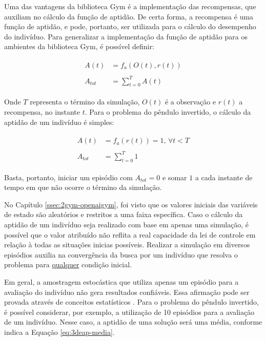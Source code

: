 Uma das vantagens da biblioteca Gym é a implementação das recompensas, que auxiliam no cálculo da função de aptidão. De certa forma, a recompensa é uma função de aptidão, e pode, portanto, ser utilizada para o cálculo do desempenho do indivíduo. Para generalizar a implementação da função de aptidão para os ambientes da biblioteca Gym, é possível definir:

\begin{align}\label{eq:3deap-calcaptidaotot}
\begin{split}
A(t) &= f_a(O(t), r(t))\\\\
A_{tot} &= \sum_{t=0}^{T}A(t)
\end{split}
\end{align}

Onde $T$ representa o término da simulação, $O(t)$ é a observação e $r(t)$ a recompensa, no instante $t$. Para o problema do pêndulo invertido, o cálculo da aptidão de um indivíduo é simples:

\begin{align}\label{eq:3deap-calcaptidaototpendinv}
\begin{split}
A(t) &= f_a(r(t))=1,\,\forall t<T\\\\
A_{tot} &= \sum_{t=0}^{T} 1
\end{split}
\end{align}

Basta, portanto, iniciar um episódio com $A_{tot}=0$ e somar $1$ a cada instante de tempo em que não ocorre o término da simulação.

No Capítulo \ref{ssec:2gym-openaigym}, foi visto que os valores iniciais das variáveis de estado são aleatórios e restritos a uma faixa específica. Caso o cálculo da aptidão de um indivíduo seja realizado com base em apenas uma simulação, é possível que o valor atribuído não reflita a real capacidade da lei de controle em relação à todas as situações inicias possíveis. Realizar a simulação em diversos episódios auxilia na convergência da busca por um indivíduo que resolva o problema para \underline{qualquer} condição inicial.

Em geral, a amostragem estocástica que utiliza apenas um episódio para a avaliação do indivíduo não gera resultados confiáveis. Essa afirmação pode ser provada através de conceitos estatísticos \cite{giacobini2002fitlimit}. Para o problema do pêndulo invertido, é possível considerar, por exemplo, a utilização de 10 episódios para a avaliação de um indivíduo. Nesse caso, a aptidão de uma solução será uma média, conforme indica a Equação \ref{eq:3deap-media}.

